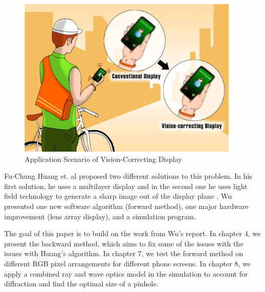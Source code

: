 \begin{figure}[ht]
  \centering
  \includegraphics[height=3in]{chapters/chapter1/images/phone.jpg}
  \caption{Application Scenario of Vision-Correcting Display \cite{Huang:2014:VisionCorrectingDisplay}}
  \label{fig:application}
\end{figure}

Fu-Chung Huang et. al proposed two different solutions to this problem. In his first solution, he uses a multilayer display \cite{Huang:2012:COA:2366145.2366204} and in the second one he uses light field technology to generate a sharp image out of the display plane \cite{Huang:2014:VisionCorrectingDisplay}. Wu \cite{Wu:EECS-2016-67} presented one new software algorithm (forward method), one major hardware improvement (lens array display), and a simulation program. 

The goal of this paper is to build on the work from Wu's report. In chapter 4, we present the backward method, which aims to fix some of the issues with the issues with Huang's algorithm. In chapter 7, we test the forward method on different RGB pixel arrangements for different phone screens. In chapter 8, we apply a combined ray and wave optics model in the simulation to account for diffraction and find the optimal size of a pinhole.


